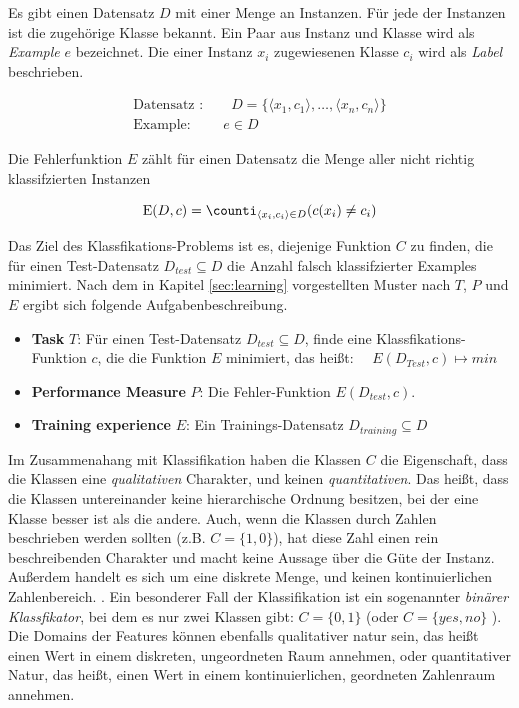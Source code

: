Es gibt einen Datensatz $D$ mit einer Menge an Instanzen. Für jede der Instanzen ist die zugehörige Klasse bekannt. Ein Paar aus Instanz und Klasse wird als \emph{Example} $e$ bezeichnet. Die einer Instanz $x_i$ zugewiesenen Klasse $c_i$ wird als \emph{Label} beschrieben.
 
\begin{equation}
\label{eq:dataAndExample}
\begin{gathered}
\text{Datensatz :} \qquad D = \{ \langle x_1, c_1 \rangle, \ldots , \langle x_n, c_n \rangle  \} \\
\text{Example: } \qquad  e \in D
\end{gathered}
\end{equation}

Die Fehlerfunktion $E$ zählt für einen Datensatz die Menge aller nicht richtig klassifzierten Instanzen

\begin{equation}
\text{E}(D,c) = \counti_{\langle x_i, c_i \rangle \in D} (c(x_i) \neq c_i)
\end{equation}

Das Ziel des Klassfikations-Problems ist es, diejenige Funktion $C$ zu finden, die für einen Test-Datensatz $D_{test} \subseteq D$ die Anzahl falsch klassifzierter Examples minimiert. Nach dem in Kapitel \ref{sec:learning} vorgestellten Muster nach $T$, $P$ und $E$ ergibt sich folgende Aufgabenbeschreibung. \cite[S. 8 - 9]{learning_cart_dobra} \cite[S. 14]{cart_loh} \cite[S. 7 - 10, 18]{machine_marsland}

\begin{itemize}
	\item \textbf{Task} $T$: Für einen Test-Datensatz $D_{test} \subseteq D$, finde eine Klassfikations-Funktion $c$, die die Funktion $E$ minimiert, das heißt: $\quad E(D_{Test}, c) \mapsto min$
	\item \textbf{Performance Measure} $P$: Die Fehler-Funktion $E(D_{test}, c)$.
	\item \textbf{Training experience} $E$: Ein Trainings-Datensatz $D_{training} \subseteq D$ 
\end{itemize}

Im Zusammenahang mit Klassifikation haben die Klassen $C$ die Eigenschaft, dass die Klassen eine \emph{qualitativen} Charakter, und keinen \emph{quantitativen}. Das heißt, dass die Klassen untereinander keine hierarchische Ordnung besitzen, bei der eine Klasse \glqq besser ist als die andere\grqq{}. Auch, wenn die Klassen durch Zahlen beschrieben werden sollten (z.B. $C = \{1,0\}$), hat diese Zahl einen rein beschreibenden Charakter und macht keine Aussage über die Güte der Instanz. Außerdem handelt es sich um eine diskrete Menge, und keinen kontinuierlichen Zahlenbereich. \cite[S. 28, 127]{statistical_learning}. Ein besonderer Fall der Klassifikation ist ein sogenannter \emph{binärer Klassfikator}, bei dem es nur zwei Klassen gibt: $C = \{0, 1\}$ (oder $C = \{yes, no\}$ ). %
Die Domains der Features können ebenfalls qualitativer natur sein, das heißt einen Wert in einem diskreten, ungeordneten Raum annehmen, oder  quantitativer Natur, das heißt, einen Wert in einem kontinuierlichen, geordneten Zahlenraum annehmen. \cite[S. 54]{machine_mitchell}

